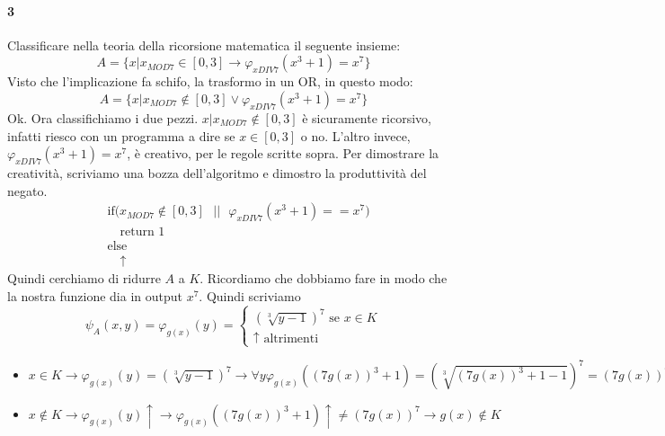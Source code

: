 \documentclass[a4paper,oneside]{scrbook}
\begin{document}
\paragraph{3} Classificare nella teoria della ricorsione matematica il seguente insieme:
\begin{equation*}
	A=\{x|x_{MOD7} \in [0,3] \rightarrow \varphi_{xDIV7}(x^3+1)=x^7\}
\end{equation*}
Visto che l'implicazione fa schifo, la trasformo in un OR, in questo modo:
\begin{equation*}
	A=\{x|x_{MOD7} \notin [0,3] \vee \varphi_{xDIV7}(x^3+1)=x^7\}
\end{equation*}
Ok. Ora classifichiamo i due pezzi. $x|x_{MOD7} \notin [0,3]$ è sicuramente ricorsivo, infatti riesco con un programma a dire se $x\in[0,3]$ o no.
L'altro invece, $\varphi_{xDIV7}(x^3+1)=x^7$, è creativo, per le regole scritte sopra.
Per dimostrare la creatività, scriviamo una bozza dell'algoritmo e dimostro la produttività del negato.
\begin{align*}
	&\text{if(}x_{MOD7} \notin [0,3] \mbox{ }||\mbox{ } \varphi_{xDIV7}(x^3+1)==x^7)\\
	&\quad \text{return }1\\
	&\text{else}\\
	&\quad \uparrow
\end{align*}                   
Quindi cerchiamo di ridurre $A$ a $K$. Ricordiamo che dobbiamo fare in modo che la nostra funzione dia in output $x^7$.
Quindi scriviamo
\begin{equation*}
	\psi_A(x,y)=
	\varphi_{g(x)}(y)=
	\begin{cases}
		(\sqrt[3]{y-1})^7 \text{ se } x \in K\\
		\uparrow \text{ altrimenti}
	\end{cases}
\end{equation*}
\begin{itemize}
	\item $x\in K \rightarrow \varphi_{g(x)}(y)=(\sqrt[3]{y-1})^7 \rightarrow \forall y \varphi_{g(x)}((7g(x))^3+1)=(\sqrt[3]{(7g(x))^3+1-1})^7=(7g(x))^7 \rightarrow g(x) \in A$
	\item $x\notin K \rightarrow \varphi_{g(x)}(y)\uparrow \rightarrow \varphi_{g(x)}((7g(x))^3+1)\uparrow \ne (7g(x))^7 \rightarrow g(x) \notin K$
\end{itemize}
\end{document}
